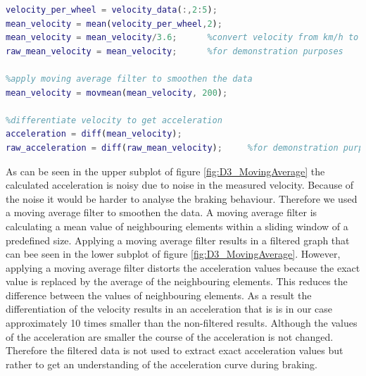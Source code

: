 \begin{lstlisting}[language=Matlab,basicstyle=\scriptsize	,caption= Preprocessing measurement data,label= lst:D3Preprocess]
%compute mean velocity of all 4 wheels
velocity_per_wheel = velocity_data(:,2:5);
mean_velocity = mean(velocity_per_wheel,2);
mean_velocity = mean_velocity/3.6;      %convert velocity from km/h to m/s
raw_mean_velocity = mean_velocity;      %for demonstration purposes

%apply moving average filter to smoothen the data
mean_velocity = movmean(mean_velocity, 200); 

%differentiate velocity to get acceleration
acceleration = diff(mean_velocity);
raw_acceleration = diff(raw_mean_velocity);     %for demonstration purposes
\end{lstlisting}

As can be seen in the upper subplot of figure \ref{fig:D3_MovingAverage} the calculated acceleration is noisy due to noise in the measured velocity.
Because of the noise it would be harder to analyse the braking behaviour. Therefore we used a moving average filter to smoothen the data.
A moving average filter is calculating a mean value of neighbouring elements within a sliding window of a predefined size.
Applying a moving average filter results in a filtered graph that can bee seen in the lower subplot of figure \ref{fig:D3_MovingAverage}. 
However, applying a moving average filter distorts the acceleration values because the exact value is replaced by the average of the neighbouring elements. This reduces the difference between the values of neighbouring elements.
As a result the differentiation of the velocity results in an acceleration that is is in our case approximately 10 times smaller than the non-filtered results.
Although the values of the acceleration are smaller the course of the acceleration is not changed.
Therefore the filtered data is not used to extract exact acceleration values but rather to get an understanding of the acceleration curve during braking.\\

